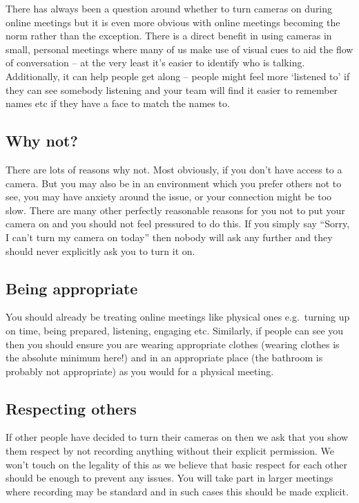 \documentclass[
]{book}
\begin{document}
There has always been a question around whether to turn cameras on during online meetings but it is even more obvious with online meetings becoming the norm rather than the exception. There is a direct benefit in using cameras in small, personal meetings where many of us make use of visual cues to aid the flow of conversation -- at the very least it's easier to identify who is talking. Additionally, it can help people get along -- people might feel more `listened to' if they can see somebody listening and your team will find it easier to remember names etc if they have a face to match the names to.

\hypertarget{why-not}{%
\subsection{Why not?}\label{why-not}}

There are lots of reasons why not. Most obviously, if you don't have access to a camera. But you may also be in an environment which you prefer others not to see, you may have anxiety around the issue, or your connection might be too slow. There are many other perfectly reasonable reasons for you not to put your camera on and you should not feel pressured to do this. If you simply say ``Sorry, I can't turn my camera on today'' then nobody will ask any further and they should never explicitly ask you to turn it on.

\hypertarget{being-appropriate}{%
\subsection{Being appropriate}\label{being-appropriate}}

You should already be treating online meetings like physical ones e.g.~turning up on time, being prepared, listening, engaging etc. Similarly, if people can see you then you should ensure you are wearing appropriate clothes (wearing clothes is the absolute minimum here!) and in an appropriate place (the bathroom is probably not appropriate) as you would for a physical meeting.

\hypertarget{respecting-others}{%
\subsection{Respecting others}\label{respecting-others}}

If other people have decided to turn their cameras on then we ask that you show them respect by not recording anything without their explicit permission. We won't touch on the legality of this as we believe that basic respect for each other should be enough to prevent any issues. You will take part in larger meetings where recording may be standard and in such cases this should be made explicit.
\end{document}
